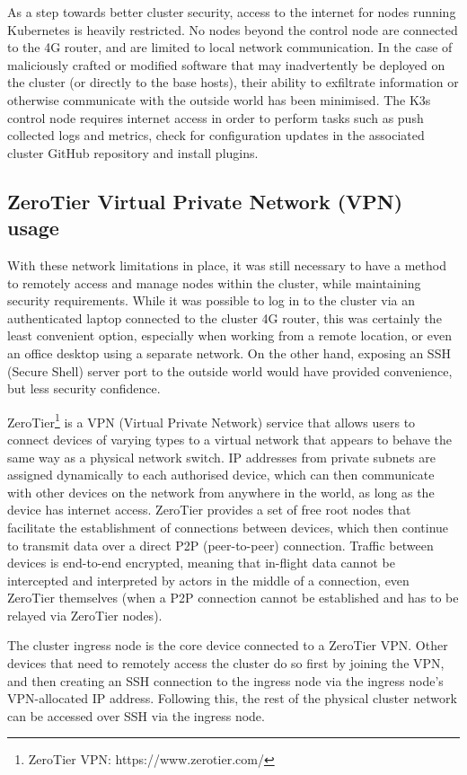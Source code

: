 As a step towards better cluster security, access to the internet for nodes running Kubernetes is heavily restricted. No nodes beyond the control node are connected to the 4G router, and are limited to local network communication. In the case of maliciously crafted or modified software that may inadvertently be deployed on the cluster (or directly to the base hosts), their ability to exfiltrate information or otherwise communicate with the outside world has been minimised. The K3s control node requires internet access in order to perform tasks such as push collected logs and metrics, check for configuration updates in the associated cluster GitHub repository and install plugins.

\subsection{ZeroTier Virtual Private Network (VPN) usage}

With these network limitations in place, it was still necessary to have a method to remotely access and manage nodes within the cluster, while maintaining security requirements. While it was possible to log in to the cluster via an authenticated laptop connected to the cluster 4G router, this was certainly the least convenient option, especially when working from a remote location, or even an office desktop using a separate network. On the other hand, exposing an SSH (Secure Shell) server port to the outside world would have provided convenience, but less security confidence.

ZeroTier\footnote{ZeroTier VPN: https://www.zerotier.com/} is a VPN (Virtual Private Network) service that allows users to connect devices of varying types to a virtual network that appears to behave the same way as a physical network switch. IP addresses from private subnets are assigned dynamically to each authorised device, which can then communicate with other devices on the network from anywhere in the world, as long as the device has internet access. ZeroTier provides a set of free root nodes that facilitate the establishment of connections between devices, which then continue to transmit data over a direct P2P (peer-to-peer) connection. Traffic between devices is end-to-end encrypted, meaning that in-flight data cannot be intercepted and interpreted by actors in the middle of a connection, even ZeroTier themselves (when a P2P connection cannot be established and has to be relayed via ZeroTier nodes).

The cluster ingress node is the core device connected to a ZeroTier VPN. Other devices that need to remotely access the cluster do so first by joining the VPN, and then creating an SSH connection to the ingress node via the ingress node's VPN-allocated IP address. Following this, the rest of the physical cluster network can be accessed over SSH via the ingress node.

